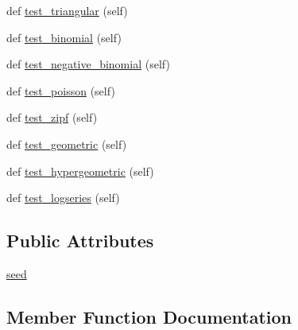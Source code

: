 \begin{DoxyCompactItemize}
\item 
def \hyperlink{classnumpy_1_1random_1_1tests_1_1test__randomstate_1_1TestBroadcast_a1d6a69c8df021485c875cb3ebe88a7f5}{test\+\_\+triangular} (self)
\item 
def \hyperlink{classnumpy_1_1random_1_1tests_1_1test__randomstate_1_1TestBroadcast_ab9c09ff65b896b85f60fee37a1b7fd8a}{test\+\_\+binomial} (self)
\item 
def \hyperlink{classnumpy_1_1random_1_1tests_1_1test__randomstate_1_1TestBroadcast_acb7b9bb504c9aa06c81924864e34931c}{test\+\_\+negative\+\_\+binomial} (self)
\item 
def \hyperlink{classnumpy_1_1random_1_1tests_1_1test__randomstate_1_1TestBroadcast_a9bf40bd2169bdea446fee5bc4e0e6bf3}{test\+\_\+poisson} (self)
\item 
def \hyperlink{classnumpy_1_1random_1_1tests_1_1test__randomstate_1_1TestBroadcast_a06786e0581ecbfbe12c2585093216dcc}{test\+\_\+zipf} (self)
\item 
def \hyperlink{classnumpy_1_1random_1_1tests_1_1test__randomstate_1_1TestBroadcast_ac39b32e5862f1179cf0cb065fa4c2579}{test\+\_\+geometric} (self)
\item 
def \hyperlink{classnumpy_1_1random_1_1tests_1_1test__randomstate_1_1TestBroadcast_a5d6136d4eda96784406c87b8789306b6}{test\+\_\+hypergeometric} (self)
\item 
def \hyperlink{classnumpy_1_1random_1_1tests_1_1test__randomstate_1_1TestBroadcast_a0a5a7436c2fbc91288a96f51ed9d73df}{test\+\_\+logseries} (self)
\end{DoxyCompactItemize}
\subsection*{Public Attributes}
\begin{DoxyCompactItemize}
\item 
\hyperlink{classnumpy_1_1random_1_1tests_1_1test__randomstate_1_1TestBroadcast_a7603f4646c57d11ebc1299ffb26c5076}{seed}
\end{DoxyCompactItemize}


\subsection{Member Function Documentation}
\mbox{\label{classnumpy_1_1random_1_1tests_1_1test__randomstate_1_1TestBroadcast_a5f8f767b8df86b6d3f1ef7b300ec9a73}} 
